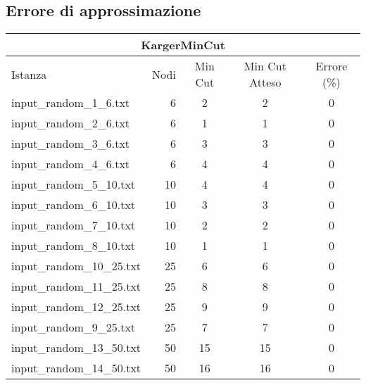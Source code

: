 \subsection{Errore di approssimazione}
\label{sec:approx-error-tables}

\begin{table}[H]
    \centering

    \begin{tabular}{lrccc}
     \hline
     \multicolumn{5}{c}{KargerMinCut} \\
     \hline
     Istanza                    &    Nodi &   Min Cut &     Min Cut Atteso &     Errore (\%) \\
     \hline
     input\_random\_1\_6.txt    &       6 &         2 &                  2 &               0 \\
     input\_random\_2\_6.txt    &       6 &         1 &                  1 &               0 \\
     input\_random\_3\_6.txt    &       6 &         3 &                  3 &               0 \\
     input\_random\_4\_6.txt    &       6 &         4 &                  4 &               0 \\
     input\_random\_5\_10.txt   &      10 &         4 &                  4 &               0 \\
     input\_random\_6\_10.txt   &      10 &         3 &                  3 &               0 \\
     input\_random\_7\_10.txt   &      10 &         2 &                  2 &               0 \\
     input\_random\_8\_10.txt   &      10 &         1 &                  1 &               0 \\
     input\_random\_10\_25.txt  &      25 &         6 &                  6 &               0 \\
     input\_random\_11\_25.txt  &      25 &         8 &                  8 &               0 \\
     input\_random\_12\_25.txt  &      25 &         9 &                  9 &               0 \\
     input\_random\_9\_25.txt   &      25 &         7 &                  7 &               0 \\
     input\_random\_13\_50.txt  &      50 &        15 &                 15 &               0 \\
     input\_random\_14\_50.txt  &      50 &        16 &                 16 &               0 \\

\end{tabular}
\end{table}
